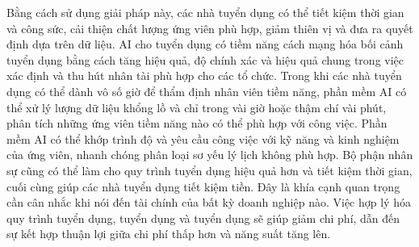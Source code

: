 Bằng cách sử dụng giải pháp này, các nhà tuyển dụng có thể tiết kiệm thời gian và công sức, cải thiện chất lượng ứng viên phù hợp, giảm thiên vị và đưa ra quyết định dựa trên dữ liệu. AI cho tuyển dụng có tiềm năng cách mạng hóa bối cảnh tuyển dụng bằng cách tăng hiệu quả, độ chính xác và hiệu quả chung trong việc xác định và thu hút nhân tài phù hợp cho các tổ chức. Trong khi các nhà tuyển dụng có thể dành vô số giờ để thẩm định nhân viên tiềm năng, phần mềm AI có thể xử lý lượng dữ liệu khổng lồ và chỉ trong vài giờ hoặc thậm chí vài phút, phân tích những ứng viên tiềm năng nào có thể phù hợp với công việc. Phần mềm AI có thể khớp trình độ và yêu cầu công việc với kỹ năng và kinh nghiệm của ứng viên, nhanh chóng phân loại sơ yếu lý lịch không phù hợp. Bộ phận nhân sự cũng có thể làm cho quy trình tuyển dụng hiệu quả hơn và tiết kiệm thời gian, cuối cùng giúp các nhà tuyển dụng tiết kiệm tiền. Đây là khía cạnh quan trọng cần cân nhắc khi nói đến tài chính của bất kỳ doanh nghiệp nào. Việc hợp lý hóa quy trình tuyển dụng, tuyển dụng và tuyển dụng sẽ giúp giảm chi phí, dẫn đến sự kết hợp thuận lợi giữa chi phí thấp hơn và năng suất tăng lên.